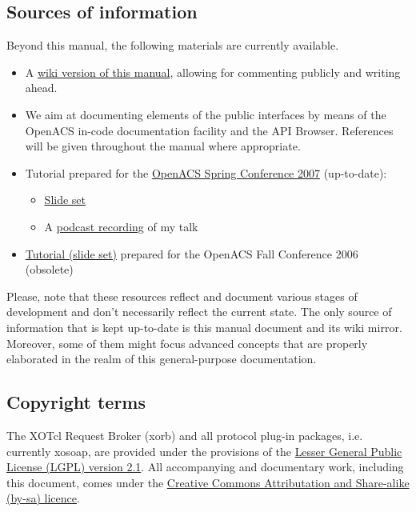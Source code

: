 \subsection{Sources of information}
Beyond this manual, the following materials are currently available.
\begin{itemize}
\item A \href{http://openacs-dotlrn.wu-wien.ac.at}{wiki version of this manual}, allowing for commenting publicly and writing ahead.
\item We aim at documenting elements of the public interfaces by means of the OpenACS in-code documentation facility and the API Browser. References will be given throughout the manual where appropriate.
\item Tutorial prepared for the \href{http://oacs-dotlrn-conf2007.wu-wien.ac.at/}{OpenACS Spring Conference 2007} (up-to-date):
\begin{itemize} 
\item \href{http://oacs-dotlrn-conf2007.wu-wien.ac.at/conf2007/file/sobernig-xosoap-slides.pdf?m=download|Slide set}{Slide set}
\item A \href{http://oacs-dotlrn-conf2007.wu-wien.ac.at/conf2007/file/tutorial-sobernig.mp4?m=download}{podcast recording} of my talk
\end{itemize}
\item \href{http://nm.wu-wien.ac.at/research/publications/b670.pdf}{Tutorial (slide set)} prepared for the OpenACS Fall Conference 2006 (obsolete) 
\end{itemize}
Please, note that these resources reflect and document various stages of development and don't necessarily reflect the current state. The only source of information that is kept up-to-date is this manual document and its wiki mirror. Moreover, some of them might focus advanced concepts that are properly elaborated in the realm of this general-purpose documentation.
\subsection{Copyright terms}
The XOTcl Request Broker (xorb) and all protocol plug-in packages, i.e. currently xosoap, are provided under the provisions of the \href{http://creativecommons.org/licenses/LGPL/2.1/}{Lesser General Public License (LGPL) version 2.1}. All accompanying and documentary work, including this document, comes under the \href{http://creativecommons.org/licenses/by-sa/2.0/at/}{Creative Commons Attributation and Share-alike (by-sa) licence}.

